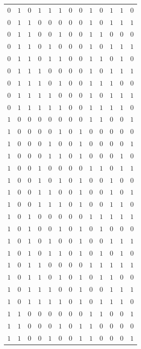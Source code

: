 \documentclass [15pt,a4paper,twoside]{article}
\begin{document}
\begin{center}
\begin{tabular}{cccccc|ccccccc}
$0$&$1$&$0$&$1$&$1$&$1$&$0$&$0$&$1$&$0$&$1$&$1$&$0$\\
$0$&$1$&$1$&$0$&$0$&$0$&$0$&$0$&$1$&$0$&$1$&$1$&$1$\\
$0$&$1$&$1$&$0$&$0$&$1$&$0$&$0$&$1$&$1$&$0$&$0$&$0$\\
$0$&$1$&$1$&$0$&$1$&$0$&$0$&$0$&$1$&$0$&$1$&$1$&$1$\\
$0$&$1$&$1$&$0$&$1$&$1$&$0$&$0$&$1$&$1$&$0$&$1$&$0$\\
$0$&$1$&$1$&$1$&$0$&$0$&$0$&$0$&$1$&$0$&$1$&$1$&$1$\\
$0$&$1$&$1$&$1$&$0$&$1$&$0$&$0$&$1$&$1$&$1$&$0$&$0$\\
$0$&$1$&$1$&$1$&$1$&$0$&$0$&$0$&$1$&$0$&$1$&$1$&$1$\\
$0$&$1$&$1$&$1$&$1$&$1$&$0$&$0$&$1$&$1$&$1$&$1$&$0$\\
$1$&$0$&$0$&$0$&$0$&$0$&$0$&$0$&$1$&$1$&$0$&$0$&$1$\\
$1$&$0$&$0$&$0$&$0$&$1$&$0$&$1$&$0$&$0$&$0$&$0$&$0$\\
$1$&$0$&$0$&$0$&$1$&$0$&$0$&$1$&$0$&$0$&$0$&$0$&$1$\\
$1$&$0$&$0$&$0$&$1$&$1$&$0$&$1$&$0$&$0$&$0$&$1$&$0$\\
$1$&$0$&$0$&$1$&$0$&$0$&$0$&$0$&$1$&$1$&$0$&$1$&$1$\\
$1$&$0$&$0$&$1$&$0$&$1$&$0$&$1$&$0$&$0$&$1$&$0$&$0$\\
$1$&$0$&$0$&$1$&$1$&$0$&$0$&$1$&$0$&$0$&$1$&$0$&$1$\\
$1$&$0$&$0$&$1$&$1$&$1$&$0$&$1$&$0$&$0$&$1$&$1$&$0$\\
$1$&$0$&$1$&$0$&$0$&$0$&$0$&$0$&$1$&$1$&$1$&$1$&$1$\\
$1$&$0$&$1$&$0$&$0$&$1$&$0$&$1$&$0$&$1$&$0$&$0$&$0$\\
$1$&$0$&$1$&$0$&$1$&$0$&$0$&$1$&$0$&$0$&$1$&$1$&$1$\\
$1$&$0$&$1$&$0$&$1$&$1$&$0$&$1$&$0$&$1$&$0$&$1$&$0$\\
$1$&$0$&$1$&$1$&$0$&$0$&$0$&$0$&$1$&$1$&$1$&$1$&$1$\\
$1$&$0$&$1$&$1$&$0$&$1$&$0$&$1$&$0$&$1$&$1$&$0$&$0$\\
$1$&$0$&$1$&$1$&$1$&$0$&$0$&$1$&$0$&$0$&$1$&$1$&$1$\\
$1$&$0$&$1$&$1$&$1$&$1$&$0$&$1$&$0$&$1$&$1$&$1$&$0$\\
$1$&$1$&$0$&$0$&$0$&$0$&$0$&$0$&$1$&$1$&$0$&$0$&$1$\\
$1$&$1$&$0$&$0$&$0$&$1$&$0$&$1$&$1$&$0$&$0$&$0$&$0$\\
$1$&$1$&$0$&$0$&$1$&$0$&$0$&$1$&$1$&$0$&$0$&$0$&$1$\\

\end{tabular}
\end{center}
\end{document}
